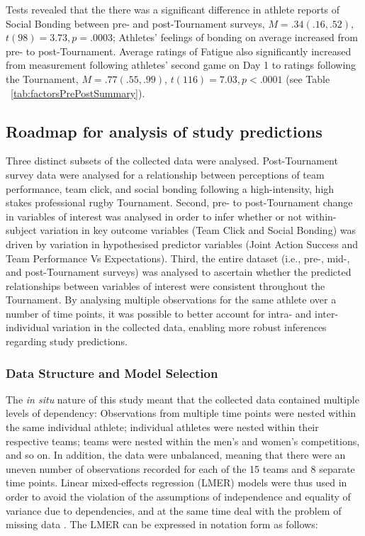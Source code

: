  Tests revealed that the there was a significant difference in athlete reports of Social Bonding between pre- and post-Tournament surveys, $M = .34(.16, .52)$, $t(98)= 3.73, p = .0003$; Athletes' feelings of bonding on average increased from pre- to post-Tournament.  Average ratings of Fatigue also significantly increased from measurement following athletes' second game on Day 1 to ratings following the Tournament, $M =  .77(.55, .99)$, $t(116)= 7.03, p < .0001$ (see Table ~\ref{tab:factorsPrePostSummary}).

 \begin{landscape}
 
  \end{landscape}
 \restoregeometry



\subsection{Roadmap for analysis of study predictions}
Three distinct subsets of the collected data were analysed. Post-Tournament survey data were analysed for a relationship between perceptions of team performance, team click, and social bonding following a high-intensity, high stakes professional rugby Tournament.  Second, pre- to post-Tournament change in variables of interest was analysed in order to infer whether or not within-subject variation in key outcome variables (Team Click and Social Bonding) was driven by variation in hypothesised predictor variables (Joint Action Success and Team Performance Vs Expectations). Third, the entire dataset (i.e., pre-, mid-, and post-Tournament surveys) was analysed to ascertain whether the predicted relationships between variables of interest were consistent throughout the Tournament.  By analysing multiple observations for the same athlete over a number of time points, it was possible to better account for intra- and inter-individual variation in the collected data, enabling more robust inferences regarding study predictions.

\subsubsection{Data Structure and Model Selection\label{survey:dataStructureModelSelection}}
The \textit{in situ} nature of this study meant that the collected data contained multiple levels of dependency: Observations from multiple time points were nested within the same individual athlete; individual athletes were nested within their respective teams; teams were nested within the men’s and women’s competitions, and so on.  In addition, the data were unbalanced, meaning that there were an uneven number of observations recorded for each of the 15 teams and 8 separate time points. Linear mixed-effects regression (LMER) models were thus used in order to avoid the violation of the assumptions of independence and equality of variance due to dependencies, and at the same time deal with the problem of missing data \citep{Quene2004,Field2012}.  The LMER can be expressed in notation form as follows:


